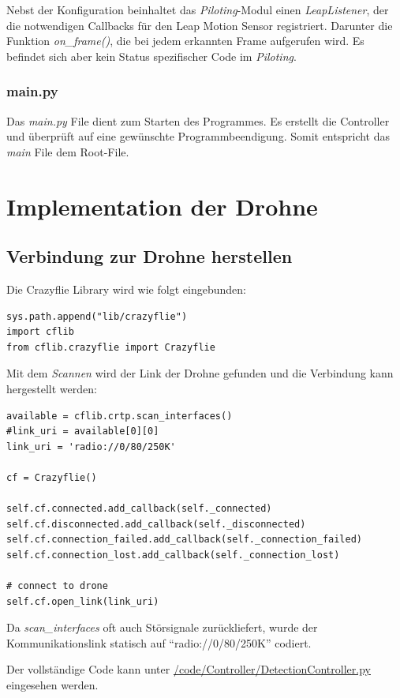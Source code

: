 Nebst der Konfiguration beinhaltet das \textit{Piloting}-Modul einen \textit{LeapListener}, der die notwendigen Callbacks für den Leap Motion Sensor registriert. Darunter die Funktion \textit{on\_frame()}, die bei jedem erkannten Frame aufgerufen wird.
Es befindet sich aber kein Status spezifischer Code im \textit{Piloting}.

\subsubsection{main.py}
Das \textit{main.py} File dient zum Starten des Programmes. Es erstellt die Controller und überprüft auf eine gewünschte Programmbeendigung. Somit entspricht das \textit{main} File dem Root-File.


\section{Implementation der Drohne}
\subsection{Verbindung zur Drohne herstellen}
Die Crazyflie Library wird wie folgt eingebunden:
\begin{lstlisting}[style=lstStyleCpp]
sys.path.append("lib/crazyflie")
import cflib
from cflib.crazyflie import Crazyflie
\end{lstlisting}

Mit dem \textit{Scannen} wird der Link der Drohne gefunden und die Verbindung kann hergestellt werden:
\begin{lstlisting}[style=lstStyleCpp]
available = cflib.crtp.scan_interfaces()
#link_uri = available[0][0]
link_uri = 'radio://0/80/250K'

cf = Crazyflie()

self.cf.connected.add_callback(self._connected)
self.cf.disconnected.add_callback(self._disconnected)
self.cf.connection_failed.add_callback(self._connection_failed)
self.cf.connection_lost.add_callback(self._connection_lost)

# connect to drone
self.cf.open_link(link_uri)
\end{lstlisting}

Da \textit{scan\_interfaces} oft auch Störsignale zurückliefert, wurde der Kommunikationslink statisch auf "`radio://0/80/250K"' codiert.

Der vollständige Code kann unter \href{https://github.com/MrJack91/droneGestures/blob/master/code/Controller/CrazyflieController.py}{/code/Controller/DetectionController.py} eingesehen werden.

